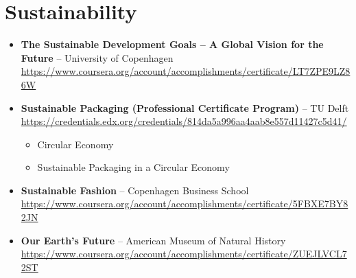 \documentclass[11pt,a4paper]{article}
\begin{document}
\section{Sustainability}
\begin{itemize}
    \item \textbf{The Sustainable Development Goals – A Global Vision for the Future} – University of Copenhagen\\
    \url{https://www.coursera.org/account/accomplishments/certificate/LT7ZPE9LZ86W}

    \item \textbf{Sustainable Packaging (Professional Certificate Program)} – TU Delft\\
    \url{https://credentials.edx.org/credentials/814da5a996aa4aab8e557d11427c5d41/}
    \begin{itemize}
        \item Circular Economy
        \item Sustainable Packaging in a Circular Economy
    \end{itemize}

    \item \textbf{Sustainable Fashion} – Copenhagen Business School\\
    \url{https://www.coursera.org/account/accomplishments/certificate/5FBXE7BY82JN}

    \item \textbf{Our Earth’s Future} – American Museum of Natural History\\
    \url{https://www.coursera.org/account/accomplishments/certificate/ZUEJLVCL72ST}
\end{itemize}
\end{document}
